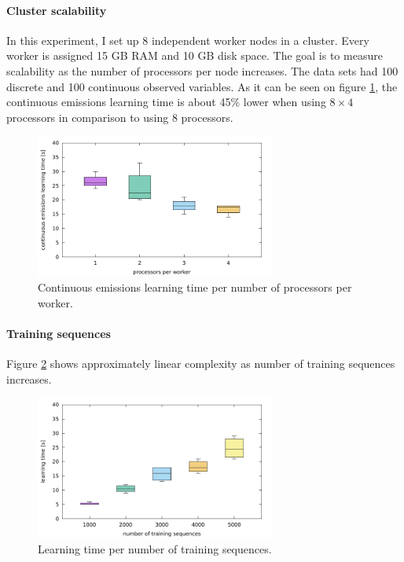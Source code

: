 \documentclass[thesis=B,english]{FITthesis}[2012/06/26]
\begin{document}
\paragraph{Cluster scalability}

In this experiment, I set up 8 independent worker nodes in a cluster. Every worker is assigned 15 GB RAM and 10 GB disk space. The goal is to measure scalability as the number of processors per node increases. The data sets had 100 discrete and 100 continuous observed variables. As it can be seen on figure \ref{fig:cluster_continuous_learning_time}, the continuous emissions learning time is about 45\% lower when using $8 \times 4$ processors in comparison to using 8 processors.

\begin{figure}
	\centering
 	\includegraphics[width=0.7\textwidth]{cluster_continuous_learning_time}
 	\caption{Continuous emissions learning time per number of processors per worker.}
 	\label{fig:cluster_continuous_learning_time}
\end{figure}

\paragraph{Training sequences}

Figure \ref{fig:learning_set_learning_time} shows approximately linear complexity as number of training sequences increases.

\begin{figure}
	\centering
 	\includegraphics[width=0.7\textwidth]{learning_set_learning_time}
 	\caption{Learning time per number of training sequences.}
 	\label{fig:learning_set_learning_time}
\end{figure}
\end{document}
